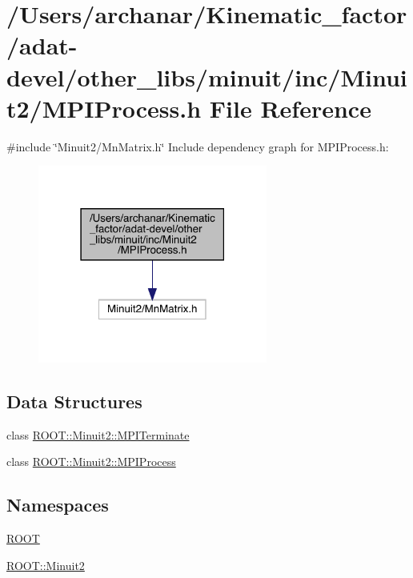 \hypertarget{adat-devel_2other__libs_2minuit_2inc_2Minuit2_2MPIProcess_8h}{}\section{/\+Users/archanar/\+Kinematic\+\_\+factor/adat-\/devel/other\+\_\+libs/minuit/inc/\+Minuit2/\+M\+P\+I\+Process.h File Reference}
\label{adat-devel_2other__libs_2minuit_2inc_2Minuit2_2MPIProcess_8h}
{\ttfamily \#include \char`\"{}Minuit2/\+Mn\+Matrix.\+h\char`\"{}}\newline
Include dependency graph for M\+P\+I\+Process.\+h\+:
\nopagebreak
\begin{figure}[H]
\begin{center}
\leavevmode
\includegraphics[width=214pt]{d4/de5/adat-devel_2other__libs_2minuit_2inc_2Minuit2_2MPIProcess_8h__incl}
\end{center}
\end{figure}
\subsection*{Data Structures}
\begin{DoxyCompactItemize}
\item 
class \mbox{\hyperlink{classROOT_1_1Minuit2_1_1MPITerminate}{R\+O\+O\+T\+::\+Minuit2\+::\+M\+P\+I\+Terminate}}
\item 
class \mbox{\hyperlink{classROOT_1_1Minuit2_1_1MPIProcess}{R\+O\+O\+T\+::\+Minuit2\+::\+M\+P\+I\+Process}}
\end{DoxyCompactItemize}
\subsection*{Namespaces}
\begin{DoxyCompactItemize}
\item 
 \mbox{\hyperlink{namespaceROOT}{R\+O\+OT}}
\item 
 \mbox{\hyperlink{namespaceROOT_1_1Minuit2}{R\+O\+O\+T\+::\+Minuit2}}
\end{DoxyCompactItemize}
